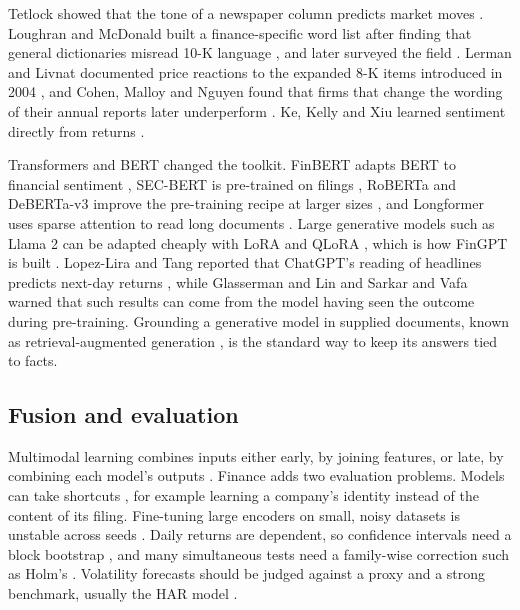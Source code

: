 \documentclass[conference]{IEEEtran}
\begin{document}
Tetlock showed that the tone of a newspaper column predicts market moves \cite{tetlock2007}. Loughran and McDonald built a finance-specific word list after finding that general dictionaries misread 10-K language \cite{loughran2011}, and later surveyed the field \cite{loughran2016}. Lerman and Livnat documented price reactions to the expanded 8-K items introduced in 2004 \cite{lerman2010}, and Cohen, Malloy and Nguyen found that firms that change the wording of their annual reports later underperform \cite{cohen2020}. Ke, Kelly and Xiu learned sentiment directly from returns \cite{kkx2019}.

Transformers \cite{vaswani2017} and BERT \cite{devlin2019} changed the toolkit. FinBERT adapts BERT to financial sentiment \cite{araci2019,huang2023finbert}, SEC-BERT is pre-trained on filings \cite{loukas2022}, RoBERTa and DeBERTa-v3 improve the pre-training recipe at larger sizes \cite{liu2019roberta,he2023deberta}, and Longformer uses sparse attention to read long documents \cite{beltagy2020}. Large generative models such as Llama 2 \cite{touvron2023} can be adapted cheaply with LoRA \cite{hu2022lora} and QLoRA \cite{dettmers2023}, which is how FinGPT is built \cite{yang2023fingpt}. Lopez-Lira and Tang reported that ChatGPT's reading of headlines predicts next-day returns \cite{lopezlira2023}, while Glasserman and Lin \cite{glasserman2023} and Sarkar and Vafa \cite{sarkar2024} warned that such results can come from the model having seen the outcome during pre-training. Grounding a generative model in supplied documents, known as retrieval-augmented generation \cite{lewis2020rag}, is the standard way to keep its answers tied to facts.

\subsection{Fusion and evaluation}

Multimodal learning combines inputs either early, by joining features, or late, by combining each model's outputs \cite{baltrusaitis2019}. Finance adds two evaluation problems. Models can take shortcuts \cite{geirhos2020}, for example learning a company's identity instead of the content of its filing. Fine-tuning large encoders on small, noisy datasets is unstable across seeds \cite{dodge2020,mosbach2021}. Daily returns are dependent, so confidence intervals need a block bootstrap \cite{kunsch1989}, and many simultaneous tests need a family-wise correction such as Holm's \cite{holm1979}. Volatility forecasts should be judged against a proxy and a strong benchmark, usually the HAR model \cite{patton2011,corsi2009}.
\end{document}
